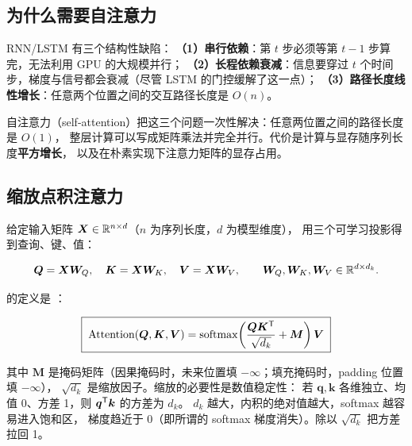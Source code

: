 \subsection{为什么需要自注意力}

RNN/LSTM 有三个结构性缺陷：
\textbf{（1）串行依赖}：第 $t$ 步必须等第 $t-1$ 步算完，无法利用 GPU 的大规模并行；
\textbf{（2）长程依赖衰减}：信息要穿过 $t$ 个时间步，梯度与信号都会衰减（尽管 LSTM 的门控缓解了这一点）；
\textbf{（3）路径长度线性增长}：任意两个位置之间的交互路径长度是 $O(n)$。

自注意力（self-attention）把这三个问题一次性解决：任意两位置之间的路径长度是 $O(1)$，
整层计算可以写成矩阵乘法并完全并行。代价是计算与显存随序列长度\textbf{平方增长}，
以及在朴素实现下注意力矩阵的显存占用。

\subsection{缩放点积注意力}

给定输入矩阵 $\bm{X} \in \mathbb{R}^{n \times d}$（$n$ 为序列长度，$d$ 为模型维度），
用三个可学习投影得到查询、键、值：

$$\bm{Q} = \bm{X}\bm{W}_Q,\quad \bm{K} = \bm{X}\bm{W}_K,\quad \bm{V} = \bm{X}\bm{W}_V,
\qquad \bm{W}_Q, \bm{W}_K, \bm{W}_V \in \mathbb{R}^{d \times d_k} .$$

 的定义是 \cite{vaswani2017attention}：

\begin{equation}
\boxed{\; \text{Attention}(\bm{Q}, \bm{K}, \bm{V}) = \operatorname{softmax}\!\left( \frac{\bm{Q}\bm{K}^{\mathsf{T}}}{\sqrt{d_k}} + \bm{M} \right) \bm{V} \;}
\label{eq:self-attention}
\end{equation}

其中 $\bm{M}$ 是掩码矩阵（因果掩码时，未来位置填 $-\infty$；填充掩码时，padding 位置填 $-\infty$），
$\sqrt{d_k}$ 是缩放因子。缩放的必要性是数值稳定性：
若 $\bm{q}, \bm{k}$ 各维独立、均值 0、方差 1，则 $\bm{q}^{\mathsf{T}}\bm{k}$ 的方差为 $d_k$。
$d_k$ 越大，内积的绝对值越大，softmax 越容易进入饱和区，
梯度趋近于 0（即所谓的 softmax 梯度消失）。除以 $\sqrt{d_k}$ 把方差拉回 1。

